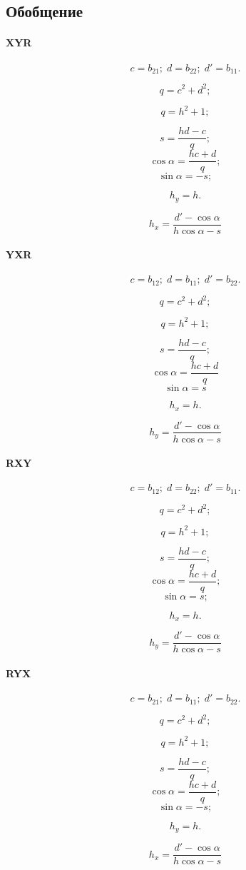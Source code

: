 \subsection{Обобщение}

\paragraph{XYR}

$$c = b_{21};\; d = b_{22};\; d' = b_{11}.$$

$$q = c^2 + d^2;$$

$$q = h^2 + 1;$$

$$s = \frac{h d - c}{q};$$
$$\cos\alpha =  \frac{h c + d}{q};$$
$$\sin\alpha = -s;$$

$$h_y = h.$$

\[{h_x}=\frac{d' - \cos\alpha}{h \cos\alpha - s}\]

\paragraph{YXR}

$$c = b_{12};\; d = b_{11};\; d' = b_{22}.$$

$$q = c^2 + d^2;$$

$$q = h^2 + 1;$$

$$s = \frac{h d - c}{q};$$
$$\cos\alpha = \frac{h c + d}{q}$$
$$\sin\alpha = s$$

$$h_x = h.$$

\[{h_y}=\frac{d' - \cos\alpha}{h \cos\alpha - s}\]

\paragraph{RXY}

$$c = b_{12};\; d = b_{22};\; d' = b_{11}.$$

$$q = c^2 + d^2;$$

$$q = h^2 + 1;$$

$$s = \frac{h d - c}{q};$$
$$\cos\alpha = \frac{h c + d}{q};$$
$$\sin\alpha = s;$$

$$h_x = h.$$

\[{h_y}=\frac{d'-\cos\alpha}{h \cos\alpha - s}\]

\paragraph{RYX}

$$c = b_{21};\; d = b_{11};\; d' = b_{22}.$$

$$q = c^2 + d^2;$$

$$q = h^2 + 1;$$

$$s = \frac{h d - c}{q};$$
$$\cos\alpha =  \frac{h c + d}{q};$$
$$\sin\alpha = -s;$$

$$h_y = h.$$

\[{h_x}=\frac{d'-\cos\alpha}{h \cos\alpha - s}\]